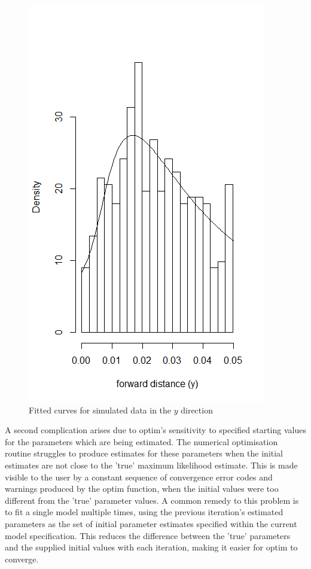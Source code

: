 \documentclass[11pt]{article}
\begin{document}
\begin{multicols}{2}
\begin{figure}[H]
\center
\includegraphics[scale=0.85]{fig8}
\caption{Fitted curves for simulated data in the $y$ direction}
\end{figure}

A second complication arises due to optim's sensitivity to specified starting values for the parameters which are being estimated. The numerical optimisation routine struggles to produce estimates for these parameters when the initial estimates are not close to the 'true' maximum likelihood estimate. This is made visible to the user by a constant sequence of convergence error codes and warnings produced by the optim function, when the initial values were too different from the 'true' parameter values. A common remedy to this problem is to fit a single model multiple times, using the previous iteration's estimated parameters as the set of initial parameter estimates specified within the current model specification. This reduces the difference between the 'true' parameters and the supplied initial values with each iteration, making it easier for optim to converge.


\end{multicols}
\end{document}
